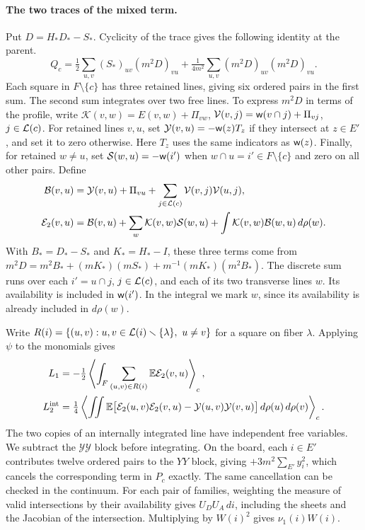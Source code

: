 \paragraph{The two traces of the mixed term.} Put \(D=H_*D_*-S_*\). Cyclicity of the trace gives the
following identity at the parent. \[
 Q_c=\tfrac12\sum_{u,v}(S_*)_{uv}(m^2D)_{vu}
       +\tfrac1{4m^2}\sum_{u,v}(m^2D)_{uv}(m^2D)_{vu}.
\] Each square in \(F\setminus\{c\}\) has three retained lines, giving six ordered pairs in the first
sum. The second sum integrates over two free lines. To express \(m^2D\) in terms of the profile, write
\(\mathcal K(v,w)=E(v,w)+\Pi_{vw}\), \(\mathcal V(v,j)=\mathsf w(v\cap j)+\Pi_{vj}\), \(j\in
\mathcal L(c)\). For retained lines \(v,u\), set \(\mathcal Y(v,u)=-\mathsf w(z)T_z\) if they intersect
at \(z\in E'\), and set it to zero otherwise. Here \(T_z\) uses the same indicators as
\(\mathsf w(z)\). Finally, for retained \(w\ne u\), set \(\mathcal S(w,u)=-\mathsf w(i')\) when
\(w\cap u=i'\in F\setminus\{c\}\) and zero on all other pairs. Define \begin{align*}
 \mathcal B(v,u)&=\mathcal Y(v,u)+\Pi_{vu}
                    +\sum_{j\in \mathcal L(c)}\mathcal V(v,j)\mathcal V(u,j),\\
 \mathcal E_2(v,u)&=\mathcal B(v,u)+\sum_w\mathcal K(v,w)\mathcal S(w,u)
                     +\int\mathcal K(v,w)\mathcal B(w,u)\,d\rho(w).
\end{align*} With \(B_*=D_*-S_*\) and \(K_*=H_*-I\), these three terms come from
\(m^2D=m^2B_*+(mK_*)(mS_*)+m^{-1}(mK_*)(m^2B_*)\). The discrete sum runs over each \(i'=u\cap j\), \(j\in
\mathcal L(c)\), and each of its two transverse lines \(w\). Its availability is included in
\(\mathsf w(i')\). In the integral we mark \(w\), since its availability is already included in
\(d\rho(w)\).

Write \(R(i)=\{(u,v):u,v\in \mathcal L(i)\smallsetminus\{\lambda\},\ u\ne v\}\) for a square on fiber
\(\lambda\). Applying \(\psi\) to the monomials gives \begin{align*}
 L_1&=-\tfrac12\left\langle\int_F
          \sum_{(u,v)\in R(i)}\mathbb E\mathcal E_2(v,u)\right\rangle_c,\\
 L_2^{\rm int}&=\tfrac14\left\langle\iint
 \mathbb E\big[\mathcal E_2(u,v)\mathcal E_2(v,u)-\mathcal Y(u,v)\mathcal Y(v,u)\big]
                 \,d\rho(u)\,d\rho(v)\right\rangle_c .
\end{align*} The two copies of an internally integrated line have independent free variables. We subtract
the \(\mathcal Y\mathcal Y\) block before integrating. On the board, each \(i\in E'\) contributes twelve
ordered pairs to the \(YY\) block, giving \(+3m^2\sum_{E'}y_i^2\), which cancels the corresponding term
in \(P_c\) exactly. The same cancellation can be checked in the continuum. For each pair of families,
weighting the measure of valid intersections by their availability gives \(U_DU_A\,di\), including the
sheets and the Jacobian of the intersection. Multiplying by \(W(i)^2\) gives \(\nu_1(i)W(i)\).

